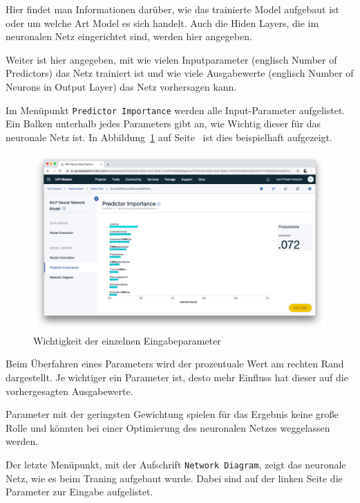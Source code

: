 Hier findet man Informationen darüber, wie das trainierte Model aufgebaut ist oder um welche Art Model es sich handelt.
Auch die Hiden Layers, die im neuronalen Netz eingerichtet sind, werden hier angegeben.

Weiter ist hier angegeben, mit wie vielen Inputparameter (englisch Number of Predictors) das Netz trainiert ist und wie
viele Ausgabewerte (englisch Number of Neurons in Output Layer) das Netz vorhersagen kann.

Im Menüpunkt \texttt{Predictor Importance} werden alle Input-Parameter aufgelistet. Ein Balken unterhalb jedes Parameters
gibt an, wie Wichtig dieser für das neuronale Netz ist. In Abbildung~\ref{fig:umsetzung_model_predictor} auf
Seite~\pageref{fig:umsetzung_model_predictor} ist dies beispielhaft aufgezeigt.

\begin{figure}[h]
    \centering
    \includegraphics[width=\textwidth]{images/kapitel_3/model_predictor.png}
    \caption{Wichtigkeit der einzelnen Eingabeparameter}
    \label{fig:umsetzung_model_predictor}
\end{figure}

Beim Überfahren eines Parameters wird der prozentuale Wert am rechten Rand dargestellt. Je wichtiger ein Parameter ist,
desto mehr Einfluss hat dieser auf die vorhergesagten Ausgabewerte.

Parameter mit der geringsten Gewichtung spielen für das Ergebnis keine große Rolle und könnten bei einer Optimierung des
neuronalen Netzes weggelassen werden.

Der letzte Menüpunkt, mit der Aufschrift \texttt{Network Diagram}, zeigt das neuronale Netz, wie es beim Traning aufgebaut
wurde. Dabei sind auf der linken Seite die Parameter zur Eingabe aufgelistet.

